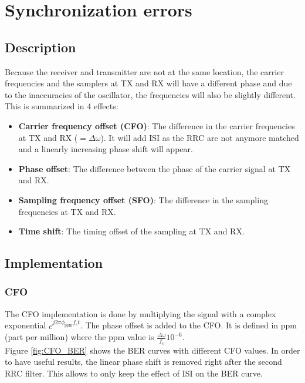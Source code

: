 \setcounter{secnumdepth}{-1}

\chapter{Synchronization errors}

\section{Description}

Because the receiver and transmitter are not at the same location, the carrier frequencies and the samplers at TX and RX will have a different phase and due to the inaccuracies of the oscillator, the frequencies will also be slightly different. \\
This is summarized in 4 effects:
\begin{itemize}
    \item \textbf{Carrier frequency offset (CFO)}: The difference in the carrier frequencies at TX and RX ($=\Delta \omega$). It will add ISI as the RRC are not anymore matched and a linearly increasing phase shift will appear.
    \item \textbf{Phase offset}: The difference between the phase of the carrier signal at TX and RX.
    \item \textbf{Sampling frequency offset (SFO)}: The difference in the sampling frequencies at TX and RX.
    \item \textbf{Time shift}: The timing offset of the sampling at TX and RX.
\end{itemize}

\section{Implementation}

\subsection{CFO}
The CFO implementation is done by multiplying the signal with a complex exponential $e^{j2\pi \phi_{\text{ppm}}f_c t}$. The phase offset is added to the CFO. It is defined in ppm (part per million) where the ppm value is $\frac{\Delta\omega}{f_c} 10^{-6}$. \\
Figure \ref{fig:CFO_BER} shows the BER curves with different CFO values. In order to have useful results, the linear phase shift is removed right after the second RRC filter. This allows to only keep the effect of ISI on the BER curve.

